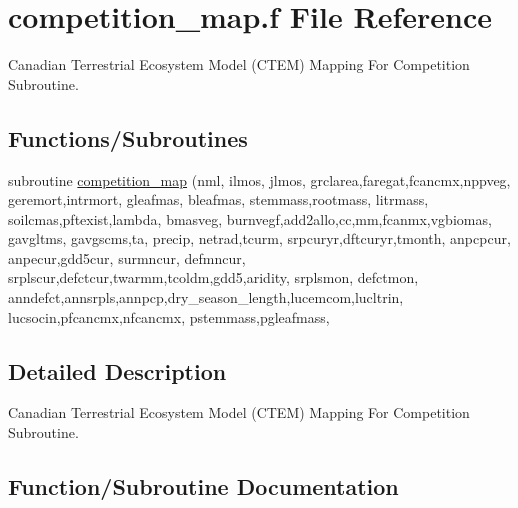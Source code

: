 \hypertarget{competition__map_8f}{}\section{competition\+\_\+map.\+f File Reference}
\label{competition__map_8f}


Canadian Terrestrial Ecosystem Model (C\+T\+E\+M) Mapping For Competition Subroutine.  


\subsection*{Functions/\+Subroutines}
\begin{DoxyCompactItemize}
\item 
subroutine \hyperlink{competition__map_8f_a854a6eedf534eff4dd50075b3a321744}{competition\+\_\+map} (nml, ilmos, jlmos, grclarea,faregat,fcancmx,nppveg, geremort,intrmort, gleafmas, bleafmas, stemmass,rootmass, litrmass, soilcmas,pftexist,lambda, bmasveg, burnvegf,add2allo,cc,mm,fcanmx,vgbiomas, gavgltms, gavgscms,ta, precip, netrad,tcurm, srpcuryr,dftcuryr,tmonth, anpcpcur, anpecur,gdd5cur, surmncur, defmncur, srplscur,defctcur,twarmm,tcoldm,gdd5,aridity, srplsmon, defctmon, anndefct,annsrpls,annpcp,dry\+\_\+season\+\_\+length,lucemcom,lucltrin, lucsocin,pfcancmx,nfcancmx, pstemmass,pgleafmass,
\end{DoxyCompactItemize}


\subsection{Detailed Description}
Canadian Terrestrial Ecosystem Model (C\+T\+E\+M) Mapping For Competition Subroutine. 



\subsection{Function/\+Subroutine Documentation}
\hypertarget{competition__map_8f_a854a6eedf534eff4dd50075b3a321744}{}
